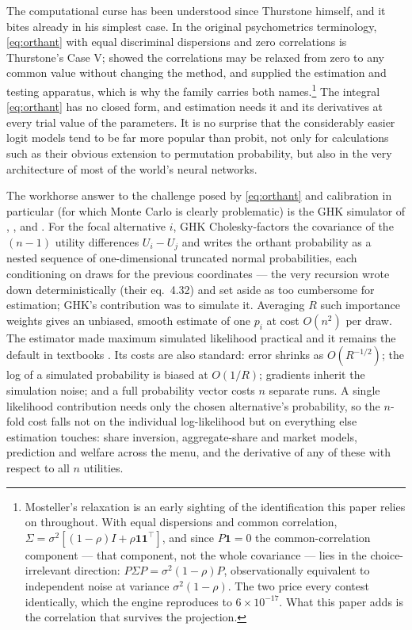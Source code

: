 \documentclass[11pt]{article}
\begin{document}
The computational curse has been understood since Thurstone himself,
and it bites already in his simplest case. In the original psychometrics
terminology, \eqref{eq:orthant} with equal discriminal dispersions and
zero correlations is Thurstone's Case V; \citet{mosteller1951} showed
the correlations may be relaxed from zero to any common value without
changing the method, and supplied the estimation and testing apparatus,
which is why the family carries both names.\footnote{Mosteller's
relaxation is an early sighting of the identification this paper relies
on throughout. With equal dispersions and common correlation,
$\Sigma=\sigma^2[(1-\rho)I+\rho\mathbf{1}\mathbf{1}^{\top}]$, and since
$P\mathbf{1}=0$ the common-correlation component --- that component, not
the whole covariance --- lies in the choice-irrelevant direction:
$P\Sigma P=\sigma^2(1-\rho)P$, observationally equivalent to independent
noise at variance $\sigma^2(1-\rho)$. The two price every contest
identically, which the engine reproduces to $6\times10^{-17}$. What this
paper adds is the correlation that survives the projection.} The integral \eqref{eq:orthant} has no closed form, and estimation
needs it and its derivatives at every trial value of the parameters. It is no surprise that the considerably easier logit models tend to be far more popular than probit, not only for calculations such as their obvious extension to permutation probability, but also in the very architecture of most of the world's neural networks.

The workhorse answer to the challenge posed by \eqref{eq:orthant} and calibration in particular (for which Monte Carlo is clearly problematic) is the GHK simulator of \citet{geweke1989},
\citet{borschsupan1993}, \citet{keane1994} and \citet{hajivassiliou1996}. For
the focal alternative $i$, GHK Cholesky-factors the covariance of the
$(n-1)$ utility differences $U_i-U_j$ and writes the orthant probability
as a nested sequence of one-dimensional truncated normal probabilities,
each conditioning on draws for the previous coordinates --- the very
recursion \citet{domencich1975} wrote down deterministically (their
eq.~4.32) and set aside as too cumbersome for estimation; GHK's
contribution was to simulate it. Averaging $R$ such importance weights gives an
unbiased, smooth estimate of one $p_i$ at cost $O(n^2)$ per draw. The estimator
made maximum simulated likelihood practical and it remains the default in
textbooks \citep{train2009}. Its costs are also standard: error shrinks as
$O(R^{-1/2})$; the log of a simulated probability is biased at $O(1/R)$;
gradients inherit the simulation noise; and a full probability vector costs
$n$ separate runs. A single likelihood contribution needs only the chosen
alternative's probability, so the $n$-fold cost falls not on the individual
log-likelihood but on everything else estimation touches: share inversion,
aggregate-share and market models, prediction and welfare across the menu,
and the derivative of any of these with respect to all $n$ utilities.
\end{document}

